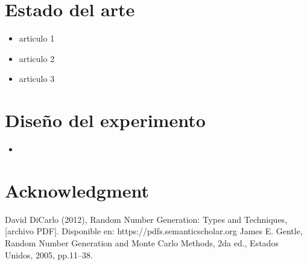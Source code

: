 \documentclass[conference]{IEEEtran}
\begin{document}
\section{Estado del arte}

\begin{itemize}
\item articulo 1


\item articulo 2


\item articulo 3

\end{itemize}


\section{Dise\~no del experimento}
\begin{itemize}

\item 
\end{itemize}



\section*{Acknowledgment}



\begin{thebibliography}{00}
 David DiCarlo (2012), Random Number Generation: Types and Techniques, [archivo PDF]. Disponible en: https://pdfs.semanticscholar.org
 James E. Gentle, Random Number Generation and Monte Carlo Methods, 2da ed., Estados Unidos, 2005, pp.11--38.

\end{thebibliography}
\vspace{12pt}
\end{document}
